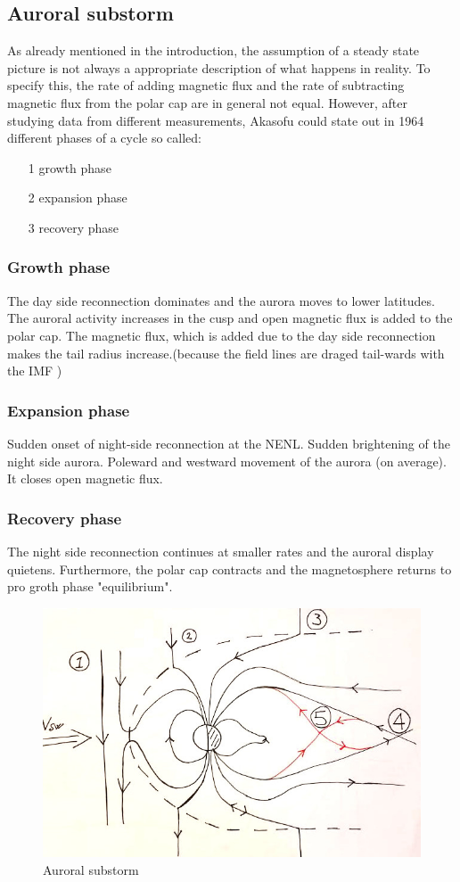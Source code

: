 \documentclass[10pt,a4paper]{article}
\begin{document}
\subsection{Auroral substorm \label{_CHAP_THEO_substorm}}
As already mentioned in the introduction, the assumption of a steady state picture is not always a appropriate description of what happens in reality. To specify this, the rate of adding magnetic flux and the rate of subtracting magnetic flux from the polar cap are in general not equal. However, after studying data from different measurements, Akasofu could state out in 1964 different phases of a cycle so called:
\begin{itemize}
\item[1] growth phase
\item[2] expansion phase
\item[3] recovery phase
\end{itemize}
\subsubsection{Growth phase}
The day side reconnection dominates and the aurora moves to lower latitudes. The auroral activity increases in the cusp and open magnetic flux is added to the polar cap. The magnetic flux, which is added due to the day side reconnection makes the tail radius increase.(because the field lines are draged tail-wards with the IMF )
\subsubsection{Expansion phase}
Sudden onset of night-side reconnection at the NENL. Sudden brightening of the night side aurora. Poleward and westward movement of the aurora (on average). It closes open magnetic flux. 
\subsubsection{Recovery phase}
The night side reconnection continues at smaller rates and the auroral display quietens. Furthermore, the polar cap contracts and the magnetosphere returns to pro groth phase "equilibrium". 
\begin{figure}[h]
\centering
\caption{Auroral substorm}
\label{aurora substorm}
\includegraphics[scale=0.5]{solvind2.jpg}
\end{figure}
\end{document}
